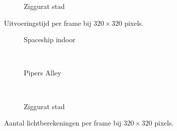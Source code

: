 \begin{figure}[t]
\begin{minipage}[t]{0.5\textwidth}
  \begin{adjustbox}{minipage=\textwidth, scale=0.55}
    \begin{subfigure}[b]{1.6\textwidth}
      \centering
      \def\svgwidth{\textwidth}
      
      \caption{Ziggurat stad}
      \label{fig:hs-ns-frame-low:exec:city}
    \end{subfigure}
  \end{adjustbox}
  \caption{\small Uitvoeringstijd per frame bij $320 \times 320$ pixels.}
  \label{fig:hs-ns-frame-low:exec}
  \end{minipage}%
  \begin{minipage}[t]{0.5\textwidth}
  \begin{adjustbox}{minipage=\textwidth, scale=0.55}
    \begin{subfigure}[b]{1.6\textwidth}
      \centering
      \def\svgwidth{\textwidth}
      
      \caption{Spaceship indoor}
      \vspace{4pt}
      \label{fig:hs-ns-frame-low:lc:indoor}
    \end{subfigure}
  \end{adjustbox} \\
  \begin{adjustbox}{minipage=\textwidth, scale=0.55}
    \begin{subfigure}[b]{1.6\textwidth}
      \centering
      \def\svgwidth{\textwidth}
      
      \caption{Pipers Alley}
      \vspace{4pt}
      \label{fig:hs-ns-frame-low:lc:alley}
    \end{subfigure}
  \end{adjustbox} \\
  \begin{adjustbox}{minipage=\textwidth, scale=0.55}
    \begin{subfigure}[b]{1.6\textwidth}
      \centering
      \def\svgwidth{\textwidth}
      
      \caption{Ziggurat stad}
      \label{fig:hs-ns-frame-low:lc:city}
    \end{subfigure}
  \end{adjustbox}
  \caption{\small Aantal lichtberekeningen per frame bij $320 \times 320$ pixels.}
  \label{fig:hs-ns-frame-low:lc}
  \end{minipage} 
\end{figure}


